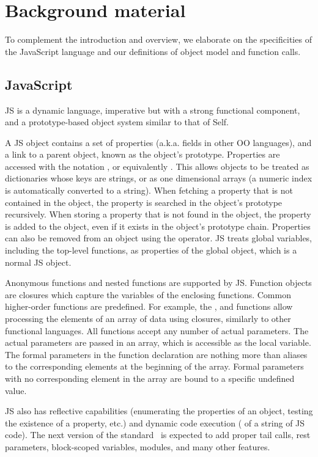 \section{Background material}

To complement the introduction and overview, we elaborate on the specificities
of the JavaScript language and our definitions of object model and function
calls.

\subsection{JavaScript}

JS is a dynamic language, imperative but with a strong functional component,
and a prototype-based object system similar to that of Self.

A JS object contains a set of properties (a.k.a. fields in other OO languages),
and a link to a parent object, known as the object's prototype. Properties are
accessed with the notation , or equivalently .
This allows objects to be treated as dictionaries whose keys are strings, or as
one dimensional arrays (a numeric index is automatically converted to a
string).  When fetching a property that is not contained in the object, the
property is searched in the object's prototype recursively. When storing a
property that is not found in the object, the property is added to the object,
even if it exists in the object's prototype chain. Properties can also be
removed from an object using the  operator. JS treats global
variables, including the top-level functions, as properties of the global
object, which is a normal JS object.

Anonymous functions and nested functions are supported by JS. Function objects
are closures which capture the variables of the enclosing functions. Common
higher-order functions are predefined. For example, the , 
and  functions allow processing the elements of an array of data
using closures, similarly to other functional languages. All functions accept
any number of actual parameters. The actual parameters are passed in an array,
which is accessible as the  local variable. The formal parameters
in the function declaration are nothing more than aliases to the corresponding
elements at the beginning of the array. Formal parameters with no corresponding
element in the array are bound to a specific undefined value.

JS also has reflective capabilities (enumerating the properties of an object,
testing the existence of a property, etc.) and dynamic code execution
( of a string of JS code).  The next version of the
standard~\cite{ECMAScript6} is expected to add proper tail calls, rest
parameters, block-scoped variables, modules, and many other features.

